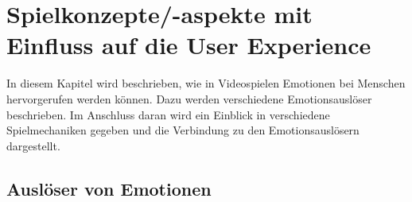 \chapter{Spielkonzepte/-aspekte mit Einfluss auf die User Experience }
\label{Kapitel:Spielkonzepte}
In diesem Kapitel wird beschrieben, wie in Videospielen Emotionen bei Menschen hervorgerufen werden können. Dazu werden verschiedene Emotionsauslöser beschrieben. Im Anschluss daran wird ein Einblick in verschiedene Spielmechaniken gegeben und die Verbindung zu den Emotionsauslösern dargestellt. %




\section{Auslöser von Emotionen}
\label{Abschnitt:AuslöserEmotionen}


